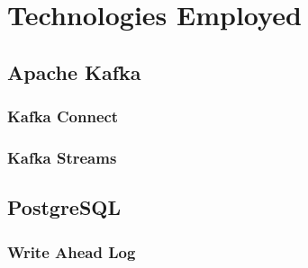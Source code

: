 \chapter{Technologies Employed}
\label{cha:techs}

\section{Apache Kafka}

\subsection{Kafka Connect}

\subsection{Kafka Streams}

\section{PostgreSQL}

\subsection{Write Ahead Log}
